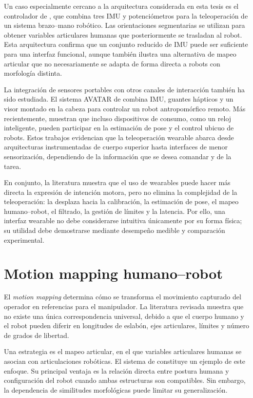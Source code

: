 Un caso especialmente cercano a la arquitectura considerada en esta tesis es el controlador de \textcite{kurpath2024teleoperation}, que combina tres IMU y potenciómetros para la teleoperación de un sistema brazo--mano robótico. Las orientaciones segmentarias se utilizan para obtener variables articulares humanas que posteriormente se trasladan al robot. Esta arquitectura confirma que un conjunto reducido de IMU puede ser suficiente para una interfaz funcional, aunque también ilustra una alternativa de mapeo articular que no necesariamente se adapta de forma directa a robots con morfología distinta.

La integración de sensores portables con otros canales de interacción también ha sido estudiada. El sistema AVATAR de \textcite{park2018avatar} combina IMU, guantes hápticos y un visor montado en la cabeza para controlar un robot antropomórfico remoto. Más recientemente, \textcite{weigend2025wearmocap} muestran que incluso dispositivos de consumo, como un reloj inteligente, pueden participar en la estimación de pose y el control ubicuo de robots. Estos trabajos evidencian que la teleoperación wearable abarca desde arquitecturas instrumentadas de cuerpo superior hasta interfaces de menor sensorización, dependiendo de la información que se desea comandar y de la tarea.

En conjunto, la literatura muestra que el uso de wearables puede hacer más directa la expresión de intención motora, pero no elimina la complejidad de la teleoperación: la desplaza hacia la calibración, la estimación de pose, el mapeo humano--robot, el filtrado, la gestión de límites y la latencia. Por ello, una interfaz wearable no debe considerarse intuitiva únicamente por su forma física; su utilidad debe demostrarse mediante desempeño medible y comparación experimental.

\section{Motion mapping humano--robot}

El \textit{motion mapping} determina cómo se transforma el movimiento capturado del operador en referencias para el manipulador. La literatura revisada muestra que no existe una única correspondencia universal, debido a que el cuerpo humano y el robot pueden diferir en longitudes de eslabón, ejes articulares, límites y número de grados de libertad.

Una estrategia es el mapeo articular, en el que variables articulares humanas se asocian con articulaciones robóticas. El sistema de \textcite{kurpath2024teleoperation} constituye un ejemplo de este enfoque. Su principal ventaja es la relación directa entre postura humana y configuración del robot cuando ambas estructuras son compatibles. Sin embargo, la dependencia de similitudes morfológicas puede limitar su generalización.

